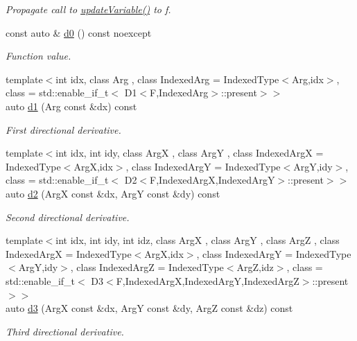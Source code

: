 \begin{DoxyCompactItemize}
\begin{DoxyCompactList}\small\item\em Propagate call to \hyperlink{structRFFGen_1_1MathematicalOperations_1_1Scale_ad90664cd65d9f0f4911a47836d21a31b}{update\-Variable()} to f. \end{DoxyCompactList}\item 
\hypertarget{structRFFGen_1_1MathematicalOperations_1_1Scale_a9e89fc6fa01ddd2a9b0e056f5d010aba}{const auto \& \hyperlink{structRFFGen_1_1MathematicalOperations_1_1Scale_a9e89fc6fa01ddd2a9b0e056f5d010aba}{d0} () const noexcept}\label{structRFFGen_1_1MathematicalOperations_1_1Scale_a9e89fc6fa01ddd2a9b0e056f5d010aba}

\begin{DoxyCompactList}\small\item\em Function value. \end{DoxyCompactList}\item 
{\footnotesize template$<$int idx, class Arg , class Indexed\-Arg  = Indexed\-Type$<$\-Arg,idx$>$, class  = std\-::enable\-\_\-if\-\_\-t$<$ D1$<$\-F,\-Indexed\-Arg$>$\-::present$>$$>$ }\\auto \hyperlink{structRFFGen_1_1MathematicalOperations_1_1Scale_a772e3b13af33837d70f5ceadc08fd97a}{d1} (Arg const \&dx) const 
\begin{DoxyCompactList}\small\item\em First directional derivative. \end{DoxyCompactList}\item 
{\footnotesize template$<$int idx, int idy, class Arg\-X , class Arg\-Y , class Indexed\-Arg\-X  = Indexed\-Type$<$\-Arg\-X,idx$>$, class Indexed\-Arg\-Y  = Indexed\-Type$<$\-Arg\-Y,idy$>$, class  = std\-::enable\-\_\-if\-\_\-t$<$ D2$<$\-F,\-Indexed\-Arg\-X,\-Indexed\-Arg\-Y$>$\-::present$>$$>$ }\\auto \hyperlink{structRFFGen_1_1MathematicalOperations_1_1Scale_a49b3374055d675325902fc8ba9a15b64}{d2} (Arg\-X const \&dx, Arg\-Y const \&dy) const 
\begin{DoxyCompactList}\small\item\em Second directional derivative. \end{DoxyCompactList}\item 
{\footnotesize template$<$int idx, int idy, int idz, class Arg\-X , class Arg\-Y , class Arg\-Z , class Indexed\-Arg\-X  = Indexed\-Type$<$\-Arg\-X,idx$>$, class Indexed\-Arg\-Y  = Indexed\-Type$<$\-Arg\-Y,idy$>$, class Indexed\-Arg\-Z  = Indexed\-Type$<$\-Arg\-Z,idz$>$, class  = std\-::enable\-\_\-if\-\_\-t$<$ D3$<$\-F,\-Indexed\-Arg\-X,\-Indexed\-Arg\-Y,\-Indexed\-Arg\-Z$>$\-::present $>$$>$ }\\auto \hyperlink{structRFFGen_1_1MathematicalOperations_1_1Scale_a087f60036322f4884121528871a15059}{d3} (Arg\-X const \&dx, Arg\-Y const \&dy, Arg\-Z const \&dz) const 
\begin{DoxyCompactList}\small\item\em Third directional derivative. \end{DoxyCompactList}\end{DoxyCompactItemize}


